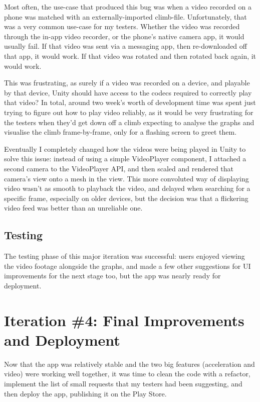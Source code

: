 Most often, the use-case that produced this bug was when a video recorded on a phone was matched with an externally-imported climb-file.
Unfortunately, that was a very common use-case for my testers.
Whether the video was recorded through the in-app video recorder, or the phone's native camera app, it would usually fail.
If that video was sent via a messaging app, then re-downloaded off that app, it would work.
If that video was rotated and then rotated back again, it would work.

This was frustrating, as surely if a video was recorded on a device, and playable by that device, Unity should have access to the codecs required to correctly play that video?
In total, around two week's worth of development time was spent just trying to figure out how to play video reliably, as it would be very frustrating for the testers when they'd get down off a climb expecting to analyse the graphs and visualise the climb frame-by-frame, only for a flashing screen to greet them.

Eventually I completely changed how the videos were being played in Unity to solve this issue: instead of using a simple VideoPlayer component, I attached a second camera to the VideoPlayer API, and then scaled and rendered that camera's view onto a mesh in the view.
This more convoluted way of displaying video wasn't as smooth to playback the video, and delayed when searching for a specific frame, especially on older devices, but the decision was that a flickering video feed was better than an unreliable one.




\subsection{Testing}
The testing phase of this major iteration was successful: users enjoyed viewing the video footage alongside the graphs, and made a few other suggestions for UI improvements for the next stage too, but the app was nearly ready for deployment.




\section{Iteration \#4: Final Improvements and Deployment}
Now that the app was relatively stable and the two big features (acceleration and video) were working well together, it was time to clean the code with a refactor, implement the list of small requests that my testers had been suggesting, and then deploy the app, publishing it on the Play Store.

